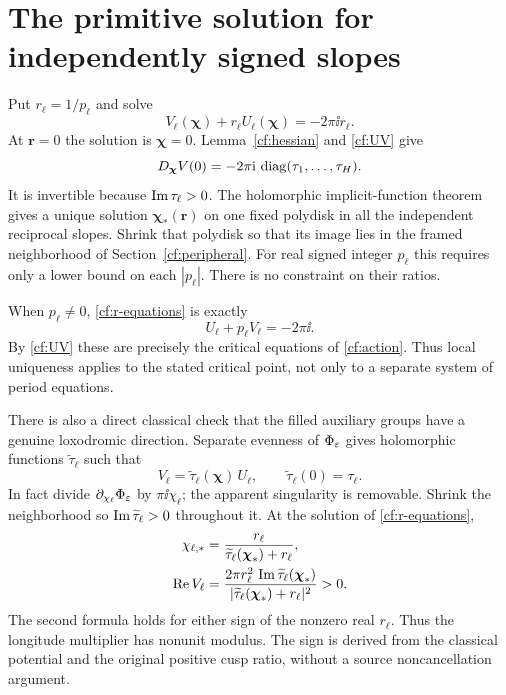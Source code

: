 \section{The primitive solution for independently signed slopes}
\label{cf:critical}

Put $r_\ell=1/p_\ell$ and solve
\begin{equation}\label{cf:r-equations}
 V_\ell(\boldsymbol\chi)+r_\ell U_\ell(\boldsymbol\chi)
                       =-2\pi\ii r_\ell .
\end{equation}
At $\mathbf r=0$ the solution is $\boldsymbol\chi=0$.
Lemma~\ref{cf:hessian} and \eqref{cf:UV} give
\begin{equation}\label{cf:Jacobian}
 D_{\boldsymbol\chi}V(0)=-2\pi\mathrm i\,\operatorname{diag}(\tau_1,\ldots,\tau_H).
\end{equation}
It is invertible because $\operatorname{Im}\tau_\ell>0$.
The holomorphic implicit-function theorem gives a unique solution
$\boldsymbol\chi_*(\mathbf r)$ on one fixed polydisk in all the
independent reciprocal slopes. Shrink that polydisk so that its
image lies in the framed neighborhood of
Section~\ref{cf:peripheral}. For real signed integer $p_\ell$
this requires only a lower bound on each $|p_\ell|$.
There is no constraint on their ratios.

When $p_\ell\ne0$, \eqref{cf:r-equations} is exactly
\begin{equation}\label{cf:slope-equations}
 U_\ell+p_\ell V_\ell=-2\pi\ii .
\end{equation}
By \eqref{cf:UV} these are precisely the critical equations of
\eqref{cf:action}. Thus local uniqueness applies to the stated
critical point, not only to a separate system of period equations.

There is also a direct classical check that the filled auxiliary
groups have a genuine loxodromic direction. Separate evenness of
$\Phi_\varepsilon$ gives holomorphic functions $\widetilde\tau_\ell$
such that
\[
 V_\ell=\widetilde\tau_\ell(\boldsymbol\chi)\,U_\ell,\qquad
 \widetilde\tau_\ell(0)=\tau_\ell .
\]
In fact divide $\partial_{\chi_\ell}\Phi_\varepsilon$ by $\pi\ii\chi_\ell$;
the apparent singularity is removable. Shrink the neighborhood
so $\operatorname{Im}\widetilde\tau_\ell>0$ throughout it.
At the solution of \eqref{cf:r-equations},
\begin{equation}\label{cf:sign}
\begin{split}
 \chi_{\ell,*}
  &=\frac{r_\ell}
          {\widetilde\tau_\ell(\boldsymbol\chi_*)+r_\ell},\\
 \operatorname{Re} V_\ell
  &=\frac{2\pi r_\ell^2\,
          \operatorname{Im}\widetilde\tau_\ell(\boldsymbol\chi_*)}
           {|\widetilde\tau_\ell(\boldsymbol\chi_*)+r_\ell|^2}
       >0 .
\end{split}
\end{equation}
The second formula holds for either sign of the nonzero real
$r_\ell$. Thus the longitude multiplier has nonunit modulus.
The sign is derived from the classical potential and the original
positive cusp ratio, without a source noncancellation argument.

